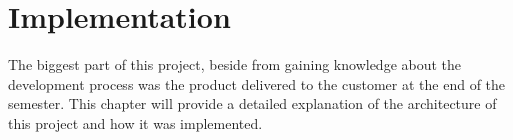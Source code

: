 \chapter{Implementation}

The biggest part of this project, beside from gaining knowledge about the development process was the product delivered to the customer at the end of the semester.
This chapter will provide a detailed explanation of the architecture of this project and how it was implemented.
\newpage



